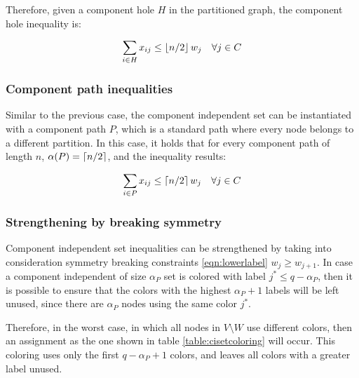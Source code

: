Therefore, given a component hole $H$ in the partitioned graph, the component hole inequality is:

\begin{equation}
\label{ineq:chole}
\sum _{i \in H} x_{ij} \leq \left\lfloor n / 2 \right\rfloor w_{j} \quad \forall j \in C
\end{equation}

\subsubsection*{Component path inequalities}

Similar to the previous case, the component independent set can be instantiated with a component path $P$, which is a standard path where every node belongs to a different partition. In this case, it holds that for every component path of length $n$, $\alpha(P) = \left\lceil n / 2 \right\rceil$, and the inequality results:

\begin{equation}
\label{ineq:cpath}
\sum _{i \in P} x_{ij} \leq \left\lceil n / 2 \right\rceil w_{j} \quad \forall j \in C
\end{equation}

\subsubsection*{Strengthening by breaking symmetry}

Component independent set inequalities can be strengthened by taking into consideration symmetry breaking constraints \ref{eqn:lowerlabel} $w_j \geq w_{j+1}$. In case a component independent of size $\alpha_P$ set is colored with label $j^* \leq q - \alpha_P$, then it is possible to ensure that the colors with the highest $\alpha_P +1$ labels will be left unused, since there are $\alpha_P$ nodes using the same color $j^*$.

Therefore, in the worst case, in which all nodes in $V \setminus W$ use different colors, then an assignment as the one shown in table \ref{table:cisetcoloring} will occur. This coloring uses only the first $q - \alpha_P + 1$ colors, and leaves all colors with a greater label unused. 

